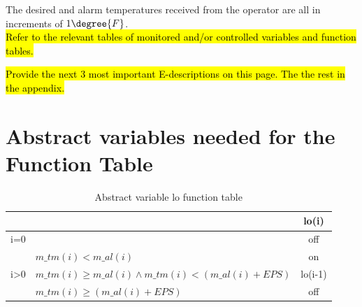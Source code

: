 \documentclass[fontsize=12pt,paper=letter,twoside]{scrartcl}
\begin{document}
{The desired and alarm temperatures received from the operator are all in increments of $1 \degree{F}$.\\}
{\hl{Refer to the relevant tables of monitored and/or controlled variables and function tables.}}
\label{E2}

\hl{Provide the next 3 most important E-descriptions on this page. The the rest in the appendix.}
\newpage
\section{Abstract variables needed for the Function Table}

\begin{table}[h]
\centering
\begin{tabular}{ll|c|}
\cline{3-3}
                                                      &                                                                        & lo(i)   \\ \hline
\multicolumn{1}{|l|}{i=0}                             &                                                                        & off     \\ \hline
\multicolumn{1}{|l|}{\multirow{3}{*}{i\textgreater0}} & $m\_tm(i) <  m\_al(i)$                                            & on      \\ \cline{2-3} 
\multicolumn{1}{|l|}{}                                & $m\_tm(i) \ge m\_al(i) \wedge m\_tm(i) < (m\_al(i) + EPS)$ & lo(i-1) \\ \cline{2-3} 
\multicolumn{1}{|l|}{}                                & $m\_tm(i) \ge(m\_al(i) + EPS) $                               & off     \\ \hline
\end{tabular}
\caption{Abstract variable lo function table}
\label{my-label}
\end{table}
\end{document}
